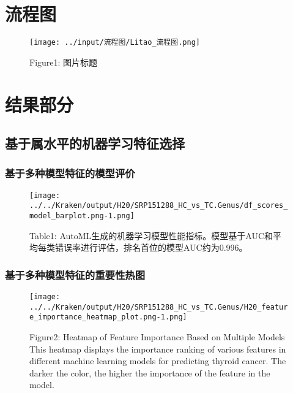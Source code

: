 \documentclass[
]{article}
\begin{document}
\section{流程图}\label{ux6d41ux7a0bux56fe}

\begin{figure}
\centering
\texttt{[image: ../input/流程图/Litao\_流程图.png]}
\caption{Figure1: 图片标题}
\end{figure}

\section{结果部分}\label{ux7ed3ux679cux90e8ux5206}

\subsection{基于属水平的机器学习特征选择}\label{ux57faux4e8eux5c5eux6c34ux5e73ux7684ux673aux5668ux5b66ux4e60ux7279ux5f81ux9009ux62e9}

\subsubsection{基于多种模型特征的模型评价}\label{ux57faux4e8eux591aux79cdux6a21ux578bux7279ux5f81ux7684ux6a21ux578bux8bc4ux4ef7}

\begin{figure}
\centering
\texttt{[image: ../../Kraken/output/H20/SRP151288\_HC\_vs\_TC.Genus/df\_scores\_model\_barplot.png-1.png]}
\caption{Table1:
AutoML生成的机器学习模型性能指标。模型基于AUC和平均每类错误率进行评估，排名首位的模型AUC约为0.996。}
\end{figure}

\subsubsection{基于多种模型特征的重要性热图}\label{ux57faux4e8eux591aux79cdux6a21ux578bux7279ux5f81ux7684ux91cdux8981ux6027ux70edux56fe}

\begin{figure}
\centering
\texttt{[image: ../../Kraken/output/H20/SRP151288\_HC\_vs\_TC.Genus/H20\_feature\_importance\_heatmap\_plot.png-1.png]}
\caption{Figure2: Heatmap of Feature Importance Based on Multiple Models
This heatmap displays the importance ranking of various features in
different machine learning models for predicting thyroid cancer. The
darker the color, the higher the importance of the feature in the
model.}
\end{figure}
\end{document}
